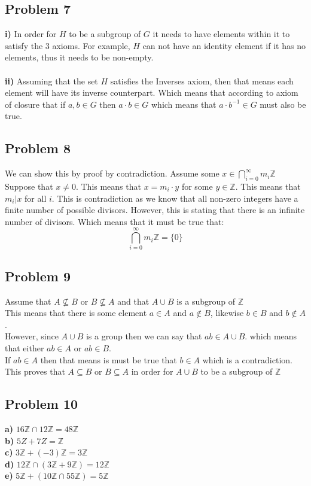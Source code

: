 \documentclass[12pt]{article}
\newcommand{\Z}{\mathbb{Z}}
\begin{document}
\subsection*{Problem 7}
\textbf{i)} In order for $H$ to be a subgroup of $G$ it needs to have elements within it to satisfy the 3 axioms. For example, $H$ can not have an identity element if it has no elements, thus it needs to be non-empty.\\\\
\textbf{ii)} Assuming that the set $H$ satisfies the Inverses axiom, then that means each element will have its inverse counterpart. Which means that according to axiom of closure that if $a,b \in G$ then $a \cdot b \in G$ which means that $a \cdot b^{-1} \in G$ must also be true. 
\newpage
\subsection*{Problem 8}
We can show this by proof by contradiction. Assume some $x \in \bigcap\limits_{i=0}^{\infty} m_i \Z$\\
Suppose that $x \neq 0$. This means that $x = m_i \cdot y$ for some $y \in \Z$. This means that $m_i | x$ for all $i$. This is contradiction as we know that all non-zero integers have a finite number of possible divisors. However, this is stating that there is an infinite number of divisors. Which means that it must be true that:
\[
	\bigcap\limits_{i=0}^{\infty} m_i \Z = \{ 0 \}
\]
\subsection*{Problem 9}
Assume that $A \nsubseteq B$ or $B \nsubseteq A$ and that $A \cup B$ is a subgroup of $\Z$\\
This means that there is some element $a \in A$ and $a \not\in B$, likewise $b \in B$ and $b \not\in A$.\\
However, since $A \cup B$ is a group then we can say that $ab \in A \cup B$. which means that either $ab \in A$ or $ab \in B$.\\
If $ab \in A$ then that means is must be true that $b \in A$ which is a contradiction.\\
This proves that $A \subseteq B$ or $B \subseteq A$ in order for $A \cup B$ to be a subgroup of $\Z$
\subsection*{Problem 10}
\textbf{a)} $16\Z \cap 12\Z = 48\Z$ \\
\textbf{b)} $5Z + 7Z = \Z$ \\
\textbf{c)} $3\Z + (-3)\Z = 3\Z$ \\
\textbf{d)} $12\Z \cap (3\Z + 9\Z) = 12\Z$\\
\textbf{e)} $5\Z + (10\Z \cap 55\Z) = 5\Z$
\end{document}
